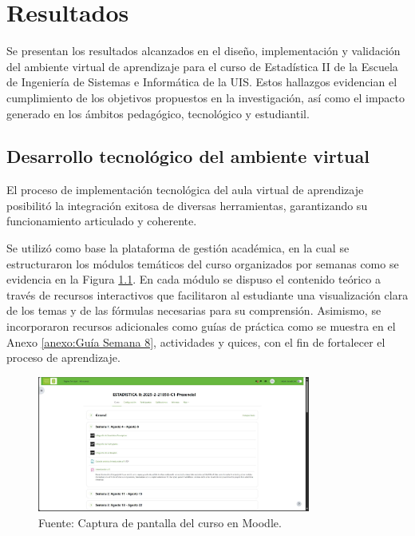 \documentclass[letter,oneside,12pt,spanish]{report}
\begin{document}
\newpage

\chapter{Resultados}

Se presentan los resultados alcanzados en el diseño, implementación y validación del ambiente virtual de aprendizaje para el curso de Estadística II de la Escuela de Ingeniería de Sistemas e Informática de la UIS. Estos hallazgos evidencian el cumplimiento de los objetivos propuestos en la investigación, así como el impacto generado en los ámbitos pedagógico, tecnológico y estudiantil.

\section{Desarrollo tecnológico del ambiente virtual}

El proceso de implementación tecnológica del aula virtual de aprendizaje posibilitó la integración exitosa de diversas herramientas, garantizando su funcionamiento articulado y coherente.

Se utilizó como base la plataforma de gestión académica, en la cual se estructuraron los módulos temáticos del curso organizados por semanas como se evidencia en la Figura \ref{fig:Moodle}. En cada módulo se dispuso el contenido teórico a través de recursos interactivos que facilitaron al estudiante una visualización clara de los temas y de las fórmulas necesarias para su comprensión. Asimismo, se incorporaron recursos adicionales como guías de práctica como se muestra en el Anexo \ref{anexo:Guía Semana 8}, actividades y quices, con el fin de fortalecer el proceso de aprendizaje. 

\begin{figure}[ht]
	\centering
	\includegraphics[width=0.8\textwidth]{Figs/Moodle.pdf}
	\label{fig:Moodle}
	\\Fuente: Captura de pantalla del curso en Moodle.
\end{figure}
\end{document}

